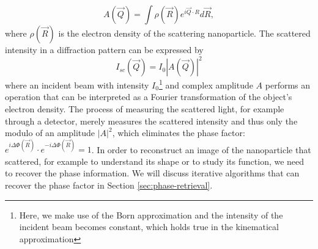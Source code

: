 \begin{equation}
A(\vec{Q})=\int \rho\left(\vec{R}\right) e^{i \vec{Q}\cdot R}d\vec{R},
\label{eq:scattered-amplitude}
\end{equation}
where $\rho\left(\vec{R}\right)$ is the electron density of the scattering nanoparticle. The scattered intensity in a diffraction pattern can be expressed by
\begin{equation}
I_{sc}\left(\vec{Q}\right)=I_{0}\left|A(\vec{Q})\right|^{2}
\label{eq:scattered-intensity}
\end{equation}
where an incident beam with intensity $I_{0}$\footnote{Here, we make use of the Born approximation and the intensity of the incident beam becomes constant, which holds true in the kinematical approximation} and complex amplitude $A$ performs an operation that can be interpreted as a Fourier transformation of the object's electron density. The process of measuring the scattered light, for example through a detector, merely measures the scattered intensity and thus only the modulo of an amplitude $\left|A\right|^{2}$, which eliminates the phase factor: $e^{i\Delta\Phi\left(\vec{R}\right)}\cdot e^{-i\Delta\Phi\left(\vec{R}\right)}=1$. In order to reconstruct an image of the nanoparticle that scattered, for example to understand its shape or to study its function, we need to recover the phase information. We will discuss iterative algorithms that can recover the phase factor in Section \ref{sec:phase-retrieval}.\\[1\baselineskip]
